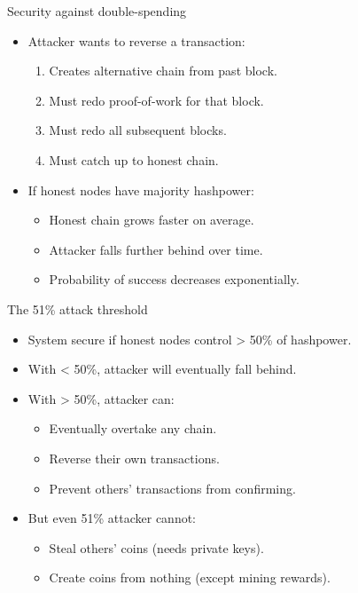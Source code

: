 \documentclass[aspectratio=169, lualatex, handout]{beamer}
\begin{document}
\begin{frame}{Security against double-spending}
	\begin{itemize}
		\item Attacker wants to reverse a transaction:
		      \begin{enumerate}
			      \item Creates alternative chain from past block.
			      \item Must redo proof-of-work for that block.
			      \item Must redo all subsequent blocks.
			      \item Must catch up to honest chain.
		      \end{enumerate}
		\item If honest nodes have majority hashpower:
		      \begin{itemize}
			      \item Honest chain grows faster on average.
			      \item Attacker falls further behind over time.
			      \item Probability of success decreases exponentially.
		      \end{itemize}
	\end{itemize}
\end{frame}

\begin{frame}{The 51\% attack threshold}
	\begin{itemize}
		\item System secure if honest nodes control > 50\% of hashpower.
		\item With < 50\%, attacker will eventually fall behind.
		\item With > 50\%, attacker can:
		      \begin{itemize}
			      \item Eventually overtake any chain.
			      \item Reverse their own transactions.
			      \item Prevent others' transactions from confirming.
		      \end{itemize}
		\item But even 51\% attacker cannot:
		      \begin{itemize}
			      \item Steal others' coins (needs private keys).
			      \item Create coins from nothing (except mining rewards).
		      \end{itemize}
	\end{itemize}
\end{frame}
\end{document}
